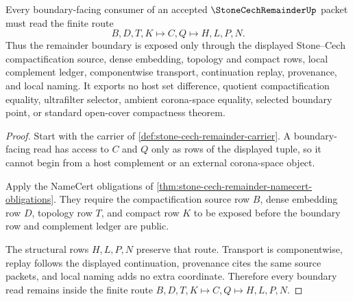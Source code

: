 \begin{theorem}
\label{thm:stone-cech-remainder-boundary-nonescape}
Every boundary-facing consumer of an accepted $\StoneCechRemainderUp$ packet must read the finite route
$$
B,D,T,K \longmapsto C,Q \longmapsto H,L,P,N .
$$
Thus the remainder boundary is exposed only through the displayed Stone--Cech compactification source, dense embedding, topology and compact rows, local complement ledger, componentwise transport, continuation replay, provenance, and local naming. It exports no host set difference, quotient compactification equality, ultrafilter selector, ambient corona-space equality, selected boundary point, or standard open-cover compactness theorem.
\end{theorem}
\begin{proof}
Start with the carrier of \autoref{def:stone-cech-remainder-carrier}. A boundary-facing read has access to $C$ and $Q$ only as rows of the displayed tuple, so it cannot begin from a host complement or an external corona-space object.

Apply the NameCert obligations of \autoref{thm:stone-cech-remainder-namecert-obligations}. They require the compactification source row $B$, dense embedding row $D$, topology row $T$, and compact row $K$ to be exposed before the boundary row and complement ledger are public.

The structural rows $H,L,P,N$ preserve that route. Transport is componentwise, replay follows the displayed continuation, provenance cites the same source packets, and local naming adds no extra coordinate. Therefore every boundary read remains inside the finite route $B,D,T,K \longmapsto C,Q \longmapsto H,L,P,N$.
\end{proof}


\begin{closurestatus}{\StoneCechRemainderUp}
  \theoryclosure{\seedClosure}
  \formalstatus{\unformalizedV}
\end{closurestatus}
